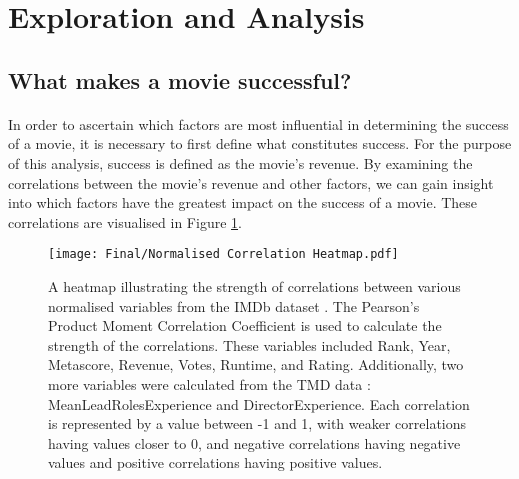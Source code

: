 \section{Exploration and Analysis}
    \subsection{What makes a movie successful?}
        \paragraph{}
            In order to ascertain which factors are most influential in determining the
                success of a movie, it is necessary to first define what constitutes success.
            For the purpose of this analysis, success is defined as the movie's revenue.
            By examining the correlations between the movie's revenue and other factors, we
                can gain insight into which factors have the greatest impact on the success of
                a movie.
            These correlations are visualised in Figure \ref{fig-heatmap}.

            \begin{figure}[H]
                \centering
                \texttt{[image: Final/Normalised Correlation Heatmap.pdf]}
                \caption[short]{
                    A heatmap illustrating the strength of correlations between various normalised
                    variables from the IMDb dataset \cite{data:IMDb}.
                    The Pearson's Product Moment Correlation Coefficient is used to calculate the
                        strength of the correlations.
                    These variables included Rank, Year, Metascore, Revenue, Votes, Runtime, and
                        Rating.
                    Additionally, two more variables were calculated from the TMD data
                        \cite{data:TMD}: MeanLeadRolesExperience and DirectorExperience.
                    Each correlation is represented by a value between -1 and 1, with weaker
                        correlations having values closer to 0, and negative correlations having
                        negative values and positive correlations having positive values.
                }\label{fig-heatmap}
            \end{figure}

